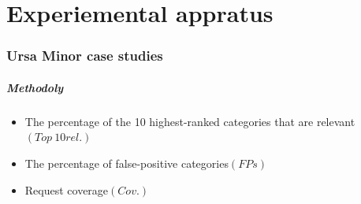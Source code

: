 \documentclass[11pt]{beamer}
\begin{document}
\part{Experiemental appratus}
\frame{\partpage}

\section{Ursa Minor case studies}
\begin{frame}
\frametitle{Methodoly}
\begin{itemize}
  \item The percentage of the 10 highest-ranked categories
  that are relevant$\left(Top\ 10 rel. \right)$
  \item The percentage of false-positive categories$\left(FPs\right)$
  \item Request coverage$\left(Cov.\right)$
\end{itemize}
\end{frame}
\end{document}
